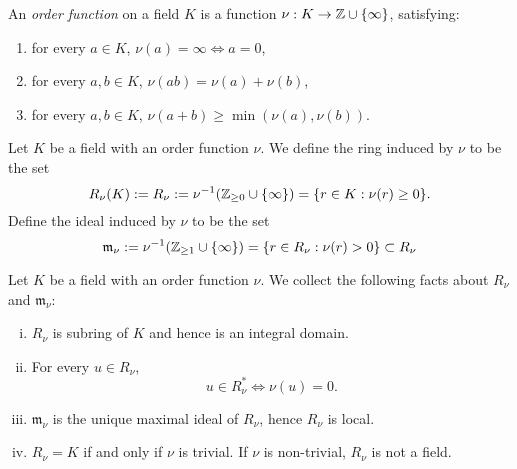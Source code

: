     \begin{definition}
        An \textit{order function} on a field $K$ is a function $\nu : K\rightarrow \mathbb{Z} \cup \{\infty\}$, satisfying:
        \begin{enumerate}
            \item for every $a\in K$, $\nu(a) = \infty \iff a =0$,
            \item for every $a,b\in K$, $\nu(ab)=\nu(a)+\nu(b)$,
            \item for every $a,b\in K$, $\nu(a+b)\geq \min(\nu(a),\nu(b))$.
        \end{enumerate}
    \end{definition}
    \begin{definition}
        Let $K$ be a field with an order function $\nu$. We define the ring induced by $\nu$ to be the set 
        $$R_\nu(K):= R_\nu := \nu^{-1}(\mathbb{Z}_{\geq 0}\cup\{\infty\})=\{r\in K: \nu(r)\geq0\}.$$
        Define the ideal induced by $\nu$ to be the set 
        $$\mathfrak{m}_\nu := \nu^{-1}(\mathbb{Z}_{\geq 1}\cup\{\infty\})=\{r\in R_\nu : \nu(r)>0\}\subset R_\nu$$
    \end{definition}
    \begin{lemma}
        Let $K$ be a field with an order function $\nu$. We collect the following facts about $R_\nu$ and $\mathfrak{m}_\nu$: 
        \begin{enumerate}[(i)]
            \item $R_\nu$ is subring of $K$ and hence is an integral domain. 
            \item For every $u\in R_\nu$, 
            $$u\in R_\nu^\ast \iff \nu(u)=0.$$
            \item $\mathfrak{m}_\nu$ is the unique maximal ideal of $R_\nu$, hence $R_\nu$ is local.
            \item $R_\nu = K$ if and only if $\nu$ is trivial. If $\nu$ is non-trivial, $R_\nu$ is not a field. 
        \end{enumerate}
    \end{lemma}
